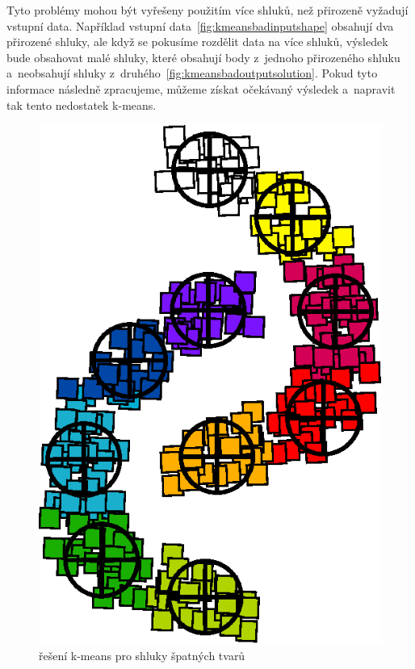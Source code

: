 Tyto problémy mohou být vyřešeny použitím více shluků, než přirozeně vyžadují vstupní data. Například vstupní data~\autoref{fig:kmeansbadinputshape} obsahují dva přirozené shluky, ale když se pokusíme rozdělit data na více shluků, výsledek bude obsahovat malé shluky, které obsahují body z~jednoho přirozeného shluku a~neobsahují shluky z~druhého~\autoref{fig:kmeansbadoutputsolution}. Pokud tyto informace následně zpracujeme, můžeme získat očekávaný výsledek a~napravit tak tento nedostatek k-means.
\begin{figure}[h]
  \centering
  \includegraphics[width=.3\textwidth]{img/kmeans_badOutputSampleShapeSolution.eps}
  \caption{řešení k-means pro shluky špatných tvarů}
  \label{fig:kmeansbadoutputsolution}
\end{figure}


